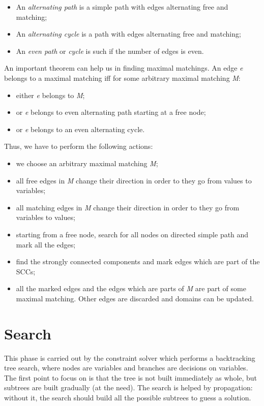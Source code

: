 \documentclass[10pt,a4paper]{article}
\begin{document}
\begin{itemize}
    \item An \textit{alternating path} is a simple path with edges alternating
    free and matching;
    \item An \textit{alternating cycle} is a path with edges alternating free
    and matching;
    \item An \textit{even path} or \textit{cycle} is such if the number of edges
    is even.
\end{itemize}
An important theorem can help us in finding maximal matchings. An edge
\textit{e} belongs to a maximal matching iff for some arbitrary maximal matching
\textit{M}:

\begin{itemize}
    \item either \textit{e} belongs to \textit{M};
    \item or \textit{e} belongs to even alternating path starting at a free
    node;
    \item or \textit{e} belongs to an even alternating cycle.
\end{itemize}
Thus, we have to perform the following actions:

\begin{itemize}
    \item we choose an arbitrary maximal matching \textit{M};
    \item all free edges in \textit{M} change their direction in order to they
    go from values to variables;
    \item all matching edges in \textit{M} change their direction in order to
    they go from variables to values;
    \item starting from a free node, search for all nodes on directed simple
    path and mark all the edges;
    \item find the strongly connected components and mark edges which are part
    of the SCCs;
    \item all the marked edges and the edges which are parts of \textit{M} are
    part of some maximal matching. Other edges are discarded and domains can be
    updated.
\end{itemize}

\section{Search}
This phase is carried out by the constraint solver which performs a backtracking
tree search, where nodes are variables and branches are decisions on variables.
The first point to focus on is that the tree is not built immediately as whole,
but subtrees are built gradually (at the need). The search is helped by
propagation: without it, the search should build all the possible subtrees to
guess a solution.
\end{document}
